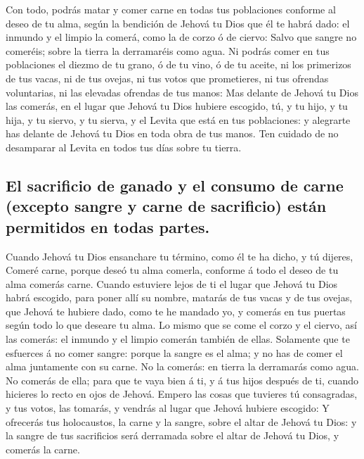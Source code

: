  Con todo, podrás matar y comer carne en todas tus
poblaciones conforme al deseo de tu alma, según la bendición de Jehová
tu Dios que él te habrá dado: el inmundo y el limpio la comerá, como la
de corzo ó de ciervo:  Salvo que sangre no comeréis; sobre
la tierra la derramaréis como agua.  Ni podrás comer en tus
poblaciones el diezmo de tu grano, ó de tu vino, ó de tu aceite, ni los
primerizos de tus vacas, ni de tus ovejas, ni tus votos que prometieres,
ni tus ofrendas voluntarias, ni las elevadas ofrendas de tus manos:
 Mas delante de Jehová tu Dios las comerás, en el lugar que
Jehová tu Dios hubiere escogido, tú, y tu hijo, y tu hija, y tu siervo,
y tu sierva, y el Levita que está en tus poblaciones: y alegrarte has
delante de Jehová tu Dios en toda obra de tus manos.  Ten
cuidado de no desamparar al Levita en todos tus días sobre tu tierra.

\hypertarget{el-sacrificio-de-ganado-y-el-consumo-de-carne-excepto-sangre-y-carne-de-sacrificio-estuxe1n-permitidos-en-todas-partes.}{%
\subsection{El sacrificio de ganado y el consumo de carne (excepto
sangre y carne de sacrificio) están permitidos en todas
partes.}\label{el-sacrificio-de-ganado-y-el-consumo-de-carne-excepto-sangre-y-carne-de-sacrificio-estuxe1n-permitidos-en-todas-partes.}}

 Cuando Jehová tu Dios ensanchare tu término, como él te ha
dicho, y tú dijeres, Comeré carne, porque deseó tu alma comerla,
conforme á todo el deseo de tu alma comerás carne.  Cuando
estuviere lejos de ti el lugar que Jehová tu Dios habrá escogido, para
poner allí su nombre, matarás de tus vacas y de tus ovejas, que Jehová
te hubiere dado, como te he mandado yo, y comerás en tus puertas según
todo lo que deseare tu alma.  Lo mismo que se come el corzo
y el ciervo, así las comerás: el inmundo y el limpio comerán también de
ellas.  Solamente que te esfuerces á no comer sangre:
porque la sangre es el alma; y no has de comer el alma juntamente con su
carne.  No la comerás: en tierra la derramarás como agua.
 No comerás de ella; para que te vaya bien á ti, y á tus
hijos después de ti, cuando hicieres lo recto en ojos de Jehová.
 Empero las cosas que tuvieres tú consagradas, y tus votos,
las tomarás, y vendrás al lugar que Jehová hubiere escogido:
 Y ofrecerás tus holocaustos, la carne y la sangre, sobre
el altar de Jehová tu Dios: y la sangre de tus sacrificios será
derramada sobre el altar de Jehová tu Dios, y comerás la carne.

